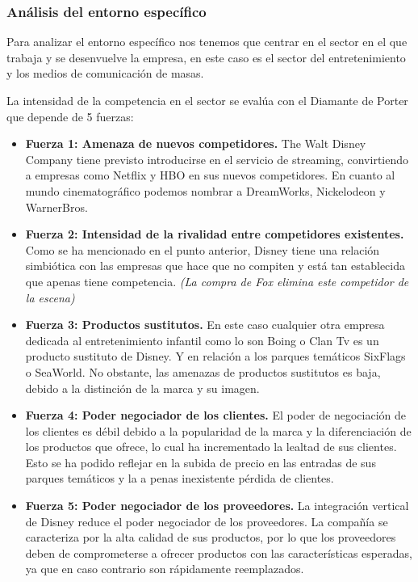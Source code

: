 \subsubsection{Análisis del entorno específico}
Para analizar el entorno específico nos tenemos que centrar en el sector en el que trabaja y se desenvuelve la empresa, en este caso es el sector del entretenimiento y los medios de comunicación de masas.

La intensidad de la competencia en el sector se evalúa con el Diamante de Porter que depende de 5 fuerzas:

\begin{itemize}

\item
\textbf{Fuerza 1: Amenaza de nuevos competidores.} The Walt Disney Company tiene previsto introducirse en el servicio de streaming, convirtiendo a empresas como Netflix y HBO en sus nuevos competidores. En cuanto al mundo cinematográfico podemos nombrar a DreamWorks, Nickelodeon y WarnerBros.

\item
\textbf{Fuerza 2: Intensidad de la rivalidad entre competidores existentes.} Como se ha mencionado en el punto anterior, Disney tiene una relación simbiótica con las empresas que hace que no compiten y está tan establecida que apenas tiene competencia. \textit{(La compra de Fox elimina este competidor de la escena)}

\item
\textbf{Fuerza 3: Productos sustitutos.} En este caso cualquier otra empresa dedicada al entretenimiento infantil como lo son Boing o Clan Tv es un producto sustituto de Disney. Y en relación a los parques temáticos SixFlags o SeaWorld. No obstante, las amenazas de productos sustitutos es baja, debido a la distinción de la marca y su imagen.

\item
\textbf{Fuerza 4: Poder negociador de los clientes.} El poder de negociación de los clientes es débil debido a la popularidad de la marca y la diferenciación de los productos que ofrece, lo cual ha incrementado la lealtad de sus clientes. Esto se ha podido reflejar en la subida de precio en las entradas de sus parques temáticos y la a penas inexistente pérdida de clientes.

\item
\textbf{Fuerza 5: Poder negociador de los proveedores.} La integración vertical de Disney reduce el poder negociador de los proveedores. La compañía se caracteriza por la alta calidad de sus productos, por lo que los proveedores deben de comprometerse a ofrecer productos con las características esperadas, ya que en caso contrario son rápidamente reemplazados.

\end{itemize}